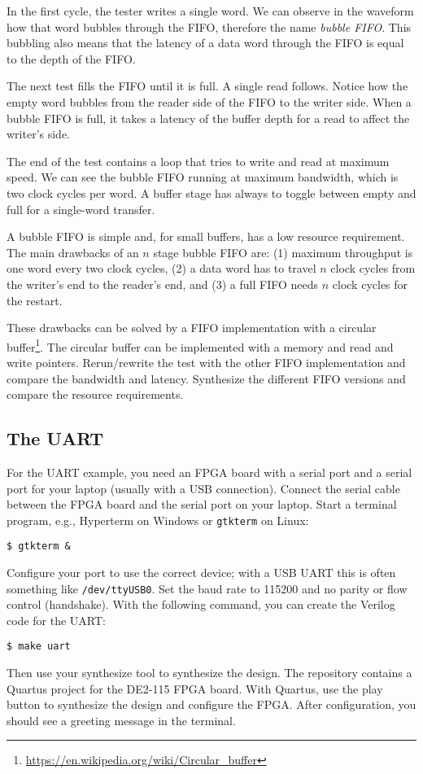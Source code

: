 \documentclass[%
    10pt,
    headinclude, footexclude,
    openright, %
    notitlepage,
    cleardoubleempty,
    headsepline,
    pointlessnumbers,
    bibtotoc, idxtotoc,
    ]{scrbook}
\newcommand{\code}[1]{{\lstinline[basicstyle=\small\ttfamily]{#1}}}
\newcommand{\myref}[2]{\href{#1}{#2}}
\renewcommand{\myref}[2]{{#2}{\footnote{\url{#1}}}}
\begin{document}
In the first cycle, the tester writes a single word. We can observe in
the waveform how that word bubbles through the FIFO, therefore the
name \emph{bubble FIFO}. This bubbling also means that the
latency of a data word through the FIFO is equal to the depth of the FIFO.

The next test fills the FIFO until it is full. A single read follows.
Notice how the empty word bubbles from the reader side of the FIFO
to the writer side. When a bubble FIFO is full, it takes
a latency of the buffer depth for a read to affect the writer's side.

The end of the test contains a loop that tries to write and read at maximum speed.
We can see the bubble FIFO running at maximum bandwidth, which is two
clock cycles per word. A buffer stage has always to toggle between empty
and full for a single-word transfer.

A bubble FIFO is simple and, for small buffers, has a low resource requirement.
The main drawbacks of an $n$ stage bubble FIFO are: (1) maximum throughput is
one word every two clock cycles, (2) a data word has to travel $n$ clock cycles
from the writer's end to the reader's end, and (3) a full FIFO needs $n$ clock cycles
for the restart.

These drawbacks can be solved by a FIFO implementation with a
\myref{https://en.wikipedia.org/wiki/Circular_buffer}{circular buffer}.
The circular buffer can be implemented with a memory and
read and write pointers.
Rerun/rewrite the test with the other FIFO implementation and compare
the bandwidth and latency. Synthesize the different FIFO versions and compare
the resource requirements.

\subsection{The UART}

For the UART example, you need an FPGA board with a serial port and
a serial port for your laptop (usually with a USB connection).
Connect the serial cable between the FPGA board and the serial port on
your laptop. Start a terminal program, e.g., Hyperterm on Windows
or \code{gtkterm} on Linux:
\begin{verbatim}
$ gtkterm &
\end{verbatim}
Configure your port to use the correct device; with a USB UART this
is often something like \code{/dev/ttyUSB0}. Set the baud rate to 115200
and no parity or flow control (handshake).
With the following command, you can create the Verilog code for the UART:
\begin{verbatim}
$ make uart
\end{verbatim}
Then use your synthesize tool to synthesize the design.
The repository contains a Quartus project for the DE2-115 FPGA board.
With Quartus, use the play button to synthesize the design and configure
the FPGA.
After configuration, you should see a greeting message in the terminal.
\end{document}
